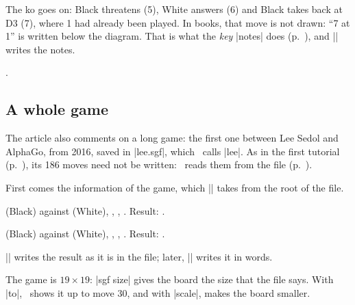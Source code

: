 \begin{goban}
The ko goes on: Black threatens (5), White answers (6) and Black takes back at D3 (7), where 1 had already been played. In books, that move is not drawn: ``7 at 1'' is written below the diagram. That is what the \emph{key} |notes| does (p.~\pageref{subsec:notas}), and |\pgfgomovenotes| writes the notes.

\begin{codeexample}[width=4.8cm]
	\begin{goban}
	\end{goban}

	\pgfgomovenotes.
\end{codeexample}

\subsection{A whole game}
\label{tut:partida}

The article also comments on a long game: the first one between Lee Sedol and AlphaGo, from 2016, saved in |lee.sgf|, which \karu\ calls |lee|. As in the first tutorial (p.~\pageref{tut:primera}), its 186 moves need not be written: \pgfgoname\ reads them from the file (p.~\pageref{subsec:sgf}).

First comes the information of the game, which |\sgfinfo| takes from the root of the file.

\begin{codeexample}

	 (Black) against  (White),
	, , .
	Result: .
\end{codeexample}

 (Black) against  (White),
, , .
Result: .

|\sgfinfo| writes the result as it is in the file; later, |\sgfdiagrams| writes it in words.

The game is $19\times19$: |sgf size| gives the board the size that the file says. With |to|, \karu\ shows it up to move 30, and with |scale|, makes the board smaller.

\begin{codeexample}[]
	\begin{goban}[sgf size = lee, captures, scale = 0.6]
	\end{goban}
\end{codeexample}


\end{goban}

